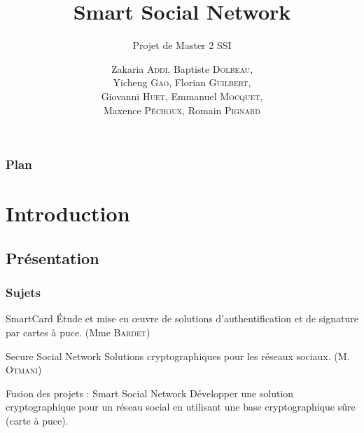 \documentclass{beamer}
\title{Smart Social Network}
\subtitle{Projet de Master 2 SSI}
\author{
    Zakaria \textsc{Addi},
    Baptiste \textsc{Dolbeau},\\
    Yicheng \textsc{Gao},
    Florian \textsc{Guilbert},\\
    Giovanni \textsc{Huet},
    Emmanuel \textsc{Mocquet},\\
    Maxence \textsc{Péchoux},
    Romain \textsc{Pignard}
}
\institute{Université de Rouen}
\begin{document}
\begin{frame}
    \titlepage 
\end{frame}

\begin{frame}
    \frametitle{Plan}
    \tableofcontents[hideallsubsections]
\end{frame}

\section{Introduction}

\subsection{Présentation}
\begin{frame}
    \frametitle{Sujets}
    \begin{block}{SmartCard}
       Étude et mise en \oe{}uvre de solutions d’authentification et de signature 
       par cartes à puce. (Mme \textsc{Bardet})
    \end{block}
    \begin{block}{Secure Social Network}
       Solutions cryptographiques pour les réseaux sociaux. (M. \textsc{Otmani})
    \end{block}
    \pause
    \begin{block}{Fusion des projets : Smart Social Network}
       Développer une solution cryptographique pour un réseau social en 
      utilisant une base cryptographique sûre (carte à puce). 
    \end{block}
\end{frame}
\end{document}
